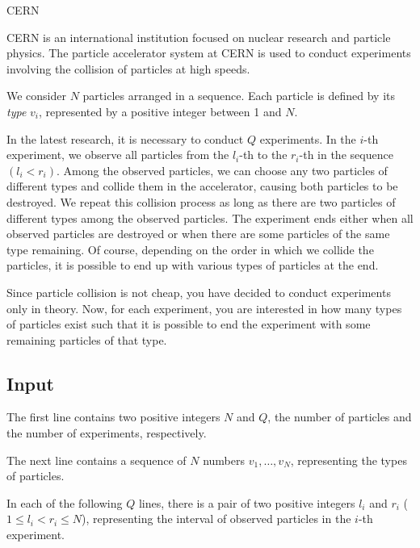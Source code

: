 \begin{statement}[
  problempoints=100,
  timelimit=4 seconds,
  memorylimit=512 MiB,
]{CERN}

CERN is an international institution focused on nuclear research and particle physics.
The particle accelerator system at CERN is used to conduct experiments involving the collision of particles at high speeds.

We consider $N$ particles arranged in a sequence. Each particle is defined by its \textit{type} $v_i$, represented by a positive integer between 1 and $N$.

In the latest research, it is necessary to conduct $Q$ experiments. In the $i$-th experiment, we observe all particles from the $l_i$-th to the $r_i$-th in the sequence $(l_i < r_i)$. Among the observed particles, we can choose any two particles of different types and collide them in the accelerator, causing both particles to be destroyed. We repeat this collision process as long as there are two particles of different types among the observed particles. The experiment ends either when all observed particles are destroyed or when there are some particles of the same type remaining. Of course, depending on the order in which we collide the particles, it is possible to end up with various types of particles at the end.

Since particle collision is not cheap, you have decided to conduct experiments only in theory. Now, for each experiment, you are interested in how many types of particles exist such that it is possible to end the experiment with some remaining particles of that type.

\subsection*{Input}

The first line contains two positive integers $N$ and $Q$, the number of particles and the number of experiments, respectively.

The next line contains a sequence of $N$ numbers $v_1, \dots, v_N$, representing the types of particles.

In each of the following $Q$ lines, there is a pair of two positive integers $l_i$ and $r_i$ ($1 \leq l_i < r_i \leq N$), representing the interval of observed particles in the $i$-th experiment.


\end{statement}
